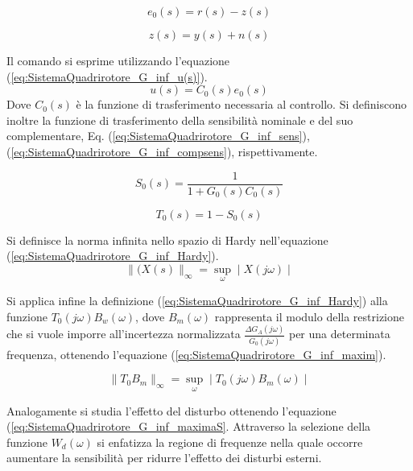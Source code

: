 \begin{equation}\label{eq:SistemaQuadrirotore_G_inf_err_0}
	e_0(s) = r(s) -z(s)
\end{equation}

\begin{equation}\label{eq:SistemaQuadrirotore_G_inf_z(s)}
	z(s) = y(s) + n(s)
\end{equation}

Il comando si esprime utilizzando l'equazione (\ref{eq:SistemaQuadrirotore_G_inf_u(s)}).
\begin{equation}\label{eq:SistemaQuadrirotore_G_inf_u(s)}
	u(s) = C_0(s) e_0(s)
\end{equation}
Dove $C_0(s)$ è la funzione di trasferimento necessaria al controllo.
Si definiscono inoltre la funzione di trasferimento della sensibilità nominale e del suo complementare, Eq. (\ref{eq:SistemaQuadrirotore_G_inf_sens}), (\ref{eq:SistemaQuadrirotore_G_inf_compsens}), rispettivamente.

\begin{equation}\label{eq:SistemaQuadrirotore_G_inf_sens}
	S_0(s) = \frac{1}{1+ G_0(s) C_0(s)}
\end{equation}

\begin{equation}\label{eq:SistemaQuadrirotore_G_inf_compsens}
	T_0(s) = 1- S_0(s)
\end{equation}

Si definisce la norma infinita nello spazio di Hardy nell'equazione (\ref{eq:SistemaQuadrirotore_G_inf_Hardy}).
\begin{equation}\label{eq:SistemaQuadrirotore_G_inf_Hardy}
	\|(X(s)\|_\infty = \sup_\omega \mid X(j \omega) \mid
\end{equation}

Si applica infine la definizione (\ref{eq:SistemaQuadrirotore_G_inf_Hardy}) alla funzione $T_0(j \omega) B_w(\omega)$, dove $B_m(\omega)$ rappresenta il modulo della restrizione che si vuole imporre all'incertezza normalizzata $\frac{\Delta G_A(j \omega)}{G_0 (j \omega)}$ per una determinata frequenza, ottenendo l'equazione (\ref{eq:SistemaQuadrirotore_G_inf_maxim}).

\begin{equation}\label{eq:SistemaQuadrirotore_G_inf_maxim}
		\|T_0 B_m\|_\infty = \sup_\omega \mid T_0(j \omega) B_m(\omega) \mid
\end{equation}

Analogamente si studia l'effetto del disturbo ottenendo l'equazione (\ref{eq:SistemaQuadrirotore_G_inf_maximaS}. Attraverso la selezione della funzione $W_d(\omega)$ si enfatizza la regione di frequenze nella quale occorre aumentare la sensibilità per ridurre l'effetto dei disturbi esterni.

